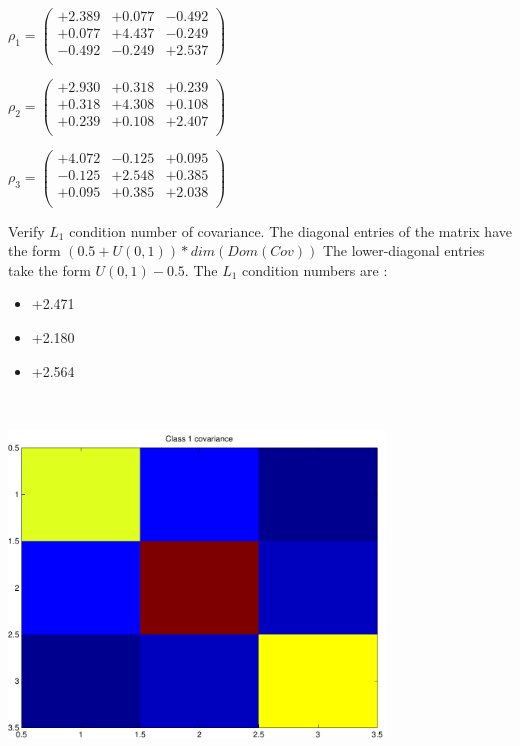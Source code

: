\documentclass[9pt]{article}
\theoremstyle{plain}
\theoremstyle{definition}
\theoremstyle{remark}
\numberwithin{equation}{section}
\begin{document}
$\rho_1 = \left(
\begin{array}{
ccc}
+2.389 & +0.077 & -0.492 \\
+0.077 & +4.437 & -0.249 \\
-0.492 & -0.249 & +2.537 \\
\end{array}
\right)$ \newline 

$\rho_2 = \left(
\begin{array}{
ccc}
+2.930 & +0.318 & +0.239 \\
+0.318 & +4.308 & +0.108 \\
+0.239 & +0.108 & +2.407 \\
\end{array}
\right)$ \newline 

$\rho_3 = \left(
\begin{array}{
ccc}
+4.072 & -0.125 & +0.095 \\
-0.125 & +2.548 & +0.385 \\
+0.095 & +0.385 & +2.038 \\
\end{array}
\right)$ \newline 

Verify $L_1$ condition number of covariance. The diagonal entries of the matrix have the form $(0.5 + U(0,1) )*dim(Dom(Cov))$
The lower-diagonal entries take the form $U(0,1) - 0.5$. 
The $L_1$ condition numbers are :
\begin{itemize}
\item +2.471
\item +2.180
\item +2.564
\end{itemize}
\includegraphics[width=10.0cm,height=10.0cm]{rv1_corr.pdf}
\end{document}
